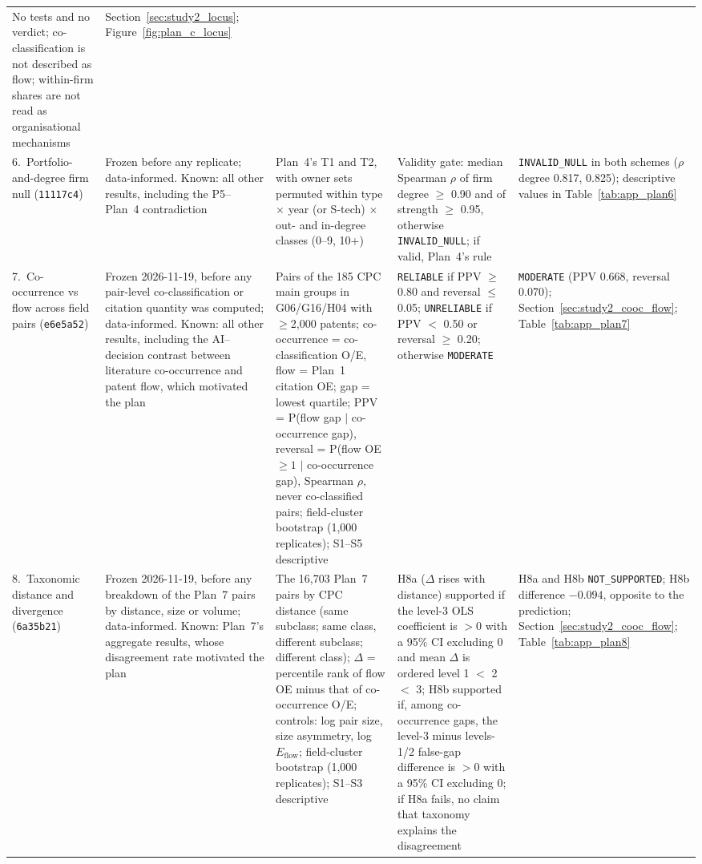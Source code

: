 \begin{table}[tbp]
\begin{tabular}{p{2.0cm}p{2.5cm}p{3.7cm}p{4.3cm}p{2.3cm}}
\raggedright No tests and no verdict; co-classification is not described as flow; within-firm shares are not read as organisational mechanisms &
\raggedright Section~\ref{sec:study2_locus}; Figure~\ref{fig:plan_c_locus} \tabularnewline
\addlinespace
\raggedright 6.~Portfolio-and-degree firm null (\texttt{11117c4}) &
\raggedright Frozen before any replicate; data-informed. Known: all other results, including the P5--Plan~4 contradiction &
\raggedright Plan~4's T1 and T2, with owner sets permuted within type $\times$ year (or S-tech) $\times$ out- and in-degree classes (0--9, 10+) &
\raggedright Validity gate: median Spearman $\rho$ of firm degree $\geq$ 0.90 and of strength $\geq$ 0.95, otherwise \texttt{INVALID\_\allowbreak NULL}; if valid, Plan~4's rule &
\raggedright \texttt{INVALID\_\allowbreak NULL} in both schemes ($\rho$ degree 0.817, 0.825); descriptive values in Table~\ref{tab:app_plan6} \tabularnewline
\addlinespace
\raggedright 7.~Co-occurrence vs flow across field pairs (\texttt{e6e5a52}) &
\raggedright Frozen 2026-11-19, before any pair-level co-classification or citation quantity was computed; data-informed. Known: all other results, including the AI--decision contrast between literature co-occurrence and patent flow, which motivated the plan &
\raggedright Pairs of the 185 CPC main groups in G06/G16/H04 with $\geq$2,000 patents; co-occurrence = co-classification O/E, flow = Plan~1 citation OE; gap = lowest quartile; PPV = P(flow gap $\mid$ co-occurrence gap), reversal = P(flow OE $\geq 1$ $\mid$ co-occurrence gap), Spearman $\rho$, never co-classified pairs; field-cluster bootstrap (1,000 replicates); S1--S5 descriptive &
\raggedright \texttt{RELIABLE} if PPV $\geq$ 0.80 and reversal $\leq$ 0.05; \texttt{UNRELIABLE} if PPV $<$ 0.50 or reversal $\geq$ 0.20; otherwise \texttt{MODERATE} &
\raggedright \texttt{MODERATE} (PPV 0.668, reversal 0.070); Section~\ref{sec:study2_cooc_flow}; Table~\ref{tab:app_plan7} \tabularnewline
\addlinespace
\raggedright 8.~Taxonomic distance and divergence (\texttt{6a35b21}) &
\raggedright Frozen 2026-11-19, before any breakdown of the Plan~7 pairs by distance, size or volume; data-informed. Known: Plan~7's aggregate results, whose disagreement rate motivated the plan &
\raggedright The 16,703 Plan~7 pairs by CPC distance (same subclass; same class, different subclass; different class); $\Delta$ = percentile rank of flow OE minus that of co-occurrence O/E; controls: log pair size, size asymmetry, log $E_{\mathrm{flow}}$; field-cluster bootstrap (1,000 replicates); S1--S3 descriptive &
\raggedright H8a ($\Delta$ rises with distance) supported if the level-3 OLS coefficient is $>0$ with a 95\% CI excluding 0 and mean $\Delta$ is ordered level 1 $<$ 2 $<$ 3; H8b supported if, among co-occurrence gaps, the level-3 minus levels-1/2 false-gap difference is $>0$ with a 95\% CI excluding 0; if H8a fails, no claim that taxonomy explains the disagreement &
\raggedright H8a and H8b \texttt{NOT\_\allowbreak SUPPORTED}; H8b difference $-0.094$, opposite to the prediction; Section~\ref{sec:study2_cooc_flow}; Table~\ref{tab:app_plan8} \tabularnewline
\bottomrule
\end{tabular}
\end{table}

